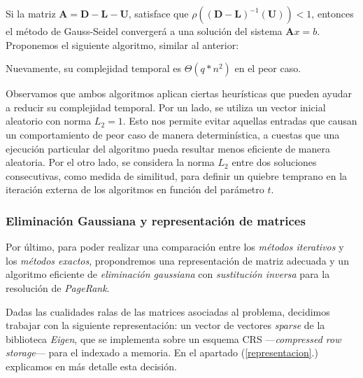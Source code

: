 \vspace{1em}
Si la matriz $\mathbf{A} = \mathbf{D} - \mathbf{L} - \mathbf{U}$, satisface que $\rho((\mathbf{D} - \mathbf{L})^{-1}(\mathbf{U})) < 1$, entonces el método de Gauss-Seidel convergerá a una solución del sistema $\mathbf{A}x = b$. Proponemos el siguiente algoritmo, similar al anterior:

\vspace{1em}


\vspace{1em}
\noindent Nuevamente, su complejidad temporal es $\Theta(q * n^2)$ en el peor caso.

\vspace{1em}
Observamos que ambos algoritmos aplican ciertas heurísticas que pueden ayudar a reducir su complejidad temporal. Por un lado, se utiliza un vector inicial aleatorio con norma $L_2 = 1$. Esto nos permite evitar aquellas entradas que causan un comportamiento de peor caso de manera determinística, a cuestas que una ejecución particular del algoritmo pueda resultar menos eficiente de manera aleatoria. Por el otro lado, se considera la norma $L_2$ entre dos soluciones consecutivas, como medida de similitud, para definir un quiebre temprano en la iteración externa de los algoritmos en función del parámetro $t$. 




\vspace{2em}
\subsubsection{Eliminación Gaussiana y representación de matrices}

Por último, para poder realizar una comparación entre los \textit{métodos iterativos} y los \textit{métodos exactos}, propondremos una representación de matriz adecuada y un algoritmo eficiente de \textit{eliminación gaussiana} con \textit{sustitución inversa} para la resolución de \textit{PageRank}.

\vspace{1em}
Dadas las cualidades ralas de las matrices asociadas al problema, decidimos trabajar con la siguiente representación: un vector de vectores \textit{sparse} de la biblioteca \textit{Eigen}, que se implementa sobre un esquema CRS ---\textit{compressed row storage}--- para el indexado a memoria. En el apartado (\ref{representacion}.) explicamos en más detalle esta decisión.

